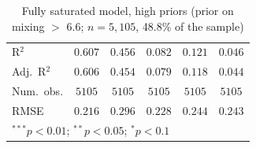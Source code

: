 \begin{table}
\begin{center}
\begin{tabular}{l c c || c c || c}
\hline
R$^2$                                  & $0.607$        & $0.456$        & $0.082$        & $0.121$        & $0.046$        \\
Adj.\ R$^2$                            & $0.606$        & $0.454$        & $0.079$        & $0.118$        & $0.044$        \\
Num.\ obs.                             & $5105$         & $5105$         & $5105$         & $5105$         & $5105$         \\
RMSE                                   & $0.216$        & $0.296$        & $0.228$        & $0.244$        & $0.243$        \\
\hline
\multicolumn{6}{l}{\scriptsize{$^{***}p<0.01$; $^{**}p<0.05$; $^{*}p<0.1$}}
\end{tabular}
\caption{Fully saturated model, high priors (prior on mixing $>$ 6.6; $n = 5,105$, 48.8\% of the sample)}
\label{tab:saturated_high_priors}
\end{center}
\end{table}

